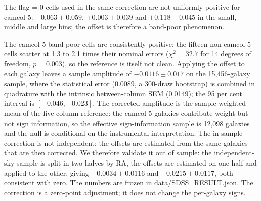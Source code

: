\documentclass[preprint,12pt,authoryear]{elsarticle}
\begin{document}
\noindent The flag = 0 cells used in the same correction are not uniformly positive for camcol 5:
$-0.063 \pm 0.059$, $+0.003 \pm 0.039$ and $+0.118 \pm 0.045$ in the small, middle and large bins;
the offset is therefore a band-poor phenomenon.

The camcol-5 band-poor cells are consistently positive; the fifteen non-camcol-5 cells scatter at
1.3 to 2.1 times their nominal errors ($\chi^2 = 32.7$ for 14 degrees of freedom, $p = 0.003$), so
the reference is itself not clean. Applying the offset to each galaxy leaves a sample amplitude of
$\mathbf{-0.0116 \pm 0.017}$ on the 15,456-galaxy sample, where the statistical error (0.0089, a
300-draw bootstrap) is combined in quadrature with the intrinsic between-column SEM (0.0149); the 95 per cent interval is $[-0.046, +0.023]$. The corrected amplitude is the
sample-weighted mean of the five-column reference: the camcol-5 galaxies contribute weight but not
sign information, so the effective sign-information sample is 12,098 galaxies and the null is
conditional on the instrumental interpretation. The in-sample correction is not independent: the offsets are
estimated from the same galaxies that are then corrected. We therefore validate it out of sample:
the independent-sky sample is split in two halves by RA, the offsets are estimated on one half and
applied to the other, giving $-0.0034 \pm 0.0116$ and $-0.0215 \pm 0.0117$, both consistent with
zero. The numbers are frozen in data/SDSS\_RESULT.json. The correction is a zero-point adjustment;
it does not change the per-galaxy signs.
\end{document}
